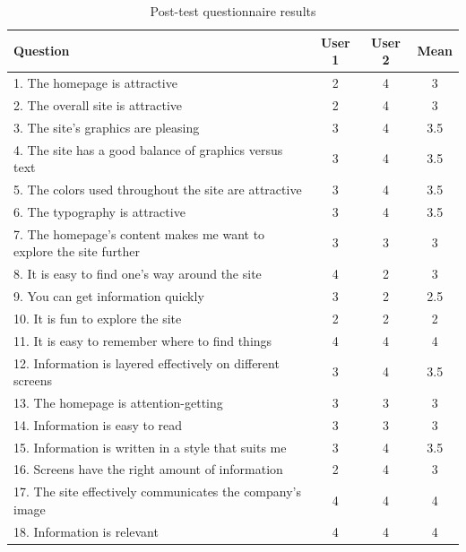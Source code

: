 \documentclass[a4paper]{article}
\begin{document}
\begin{table}[H]
\caption{Post-test questionnaire results}
\label{table:post-test_results}
\begin{center}
\footnotesize
{}
\begin{tabular}{p{30em}| c | c | c}
\hline
\textbf{Question} & \textbf{User 1} & \textbf{User 2}  & \textbf{Mean} \\
\hline
1. The homepage is attractive                            &  2  & 4 & 3 \\
2. The overall site is attractive                        &  2  & 4 & 3  \\     
3. The site's graphics are pleasing                      &  3  & 4 & 3.5   \\
4. The site has a good balance of graphics versus text   &  3  & 4 & 3.5   \\
5. The colors used throughout the site are attractive    &  3  & 4 & 3.5   \\
6. The typography is attractive                          &  3  & 4 & 3.5   \\
7. The homepage’s content makes me want to explore the site further  & 3  &  3 & 3   \\
8. It is easy to find one’s way around the site                &  4  &  2 & 3  \\
9. You can get information quickly                             &  3  &  2 & 2.5  \\
\rowcolor{red!20}
10. It is fun to explore the site                              &  2  &  2 & 2  \\
\rowcolor{green!20}
11. It is easy to remember where to find things                &  4  &  4 & 4  \\
12. Information is layered effectively on different screens    &  3  &  4 & 3.5  \\
13. The homepage is attention-getting                          &  3  &  3 & 3  \\
14. Information is easy to read                                &  3  &  3 & 3  \\
15. Information is written in a style that suits me            &  3  &  4 & 3.5  \\
16. Screens have the right amount of information               &  2  &  4 & 3 \\
\rowcolor{green!20}
17. The site effectively communicates the company’s image      &  4  &  4 & 4  \\
\rowcolor{green!20}
18. Information is relevant                                    &  4  &  4 & 4  \\

\end{tabular}
\end{center}
\end{table}
\end{document}
